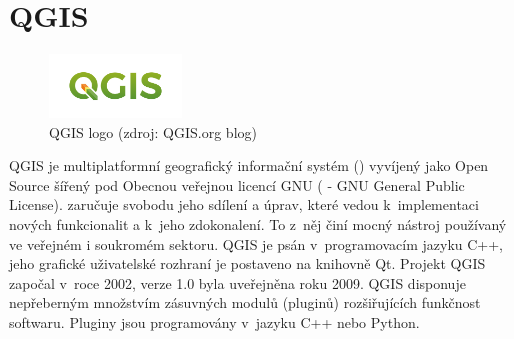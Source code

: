 \section{QGIS}

\begin{figure}[H] \centering
      \includegraphics[width=100pt]{./pictures/qgis.png}
      \caption[QGIS logo]{QGIS logo (zdroj: QGIS.org blog)}
      \label{fig:qgis}
\end{figure}
 
QGIS je multiplatformní geografický informační systém ()
vyvíjený jako Open Source šířený pod Obecnou veřejnou licencí GNU
( - GNU General Public License).  zaručuje
svobodu jeho sdílení a úprav, které vedou k~implementaci nových
funkcionalit a k~jeho zdokonalení. To z~něj činí mocný nástroj
používaný ve veřejném i soukromém sektoru. QGIS je psán
v~programovacím jazyku C++, jeho grafické uživatelské rozhraní je
postaveno na knihovně Qt. Projekt QGIS započal v~roce 2002, verze 1.0
byla uveřejněna roku 2009. QGIS disponuje nepřeberným množstvím
zásuvných modulů (pluginů) rozšiřujících funkčnost softwaru. Pluginy
jsou programovány v~jazyku C++ nebo Python. \cite{masteringQgis}
